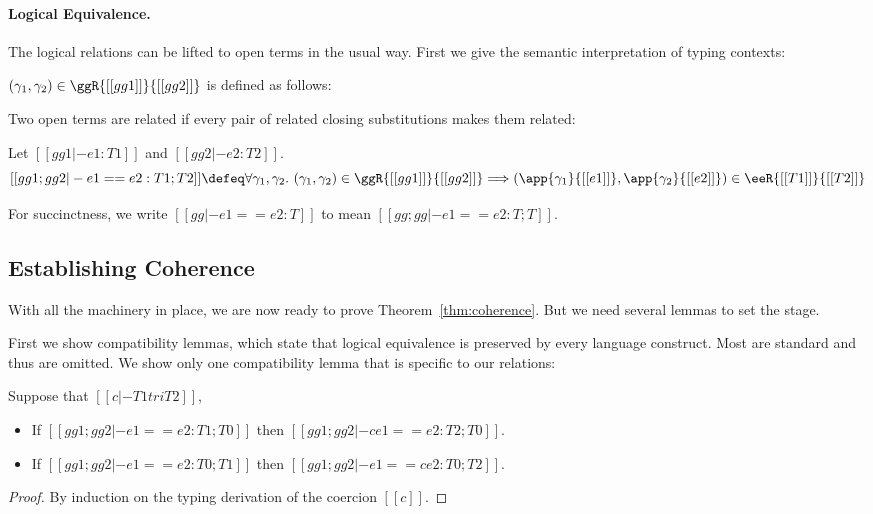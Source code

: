 \paragraph{Logical Equivalence.}
The logical relations can be lifted to open terms in the usual way. First we give the
semantic interpretation of typing contexts:
\begin{definition}
  $(\gamma_1, \gamma_2) \in \ggR{[[gg1]]}{[[gg2]]}$ is defined as follows:
\end{definition}
Two open terms are related if every pair of related closing substitutions
makes them related:
\begin{definition}
  Let $[[gg1 |- e1 : T1]]$ and $[[gg2 |- e2 : T2]]$.
  \[
    [[gg1 ; gg2 |- e1 == e2 : T1 ; T2]] \defeq \forall \gamma_1, \gamma_2 . \  (\gamma_1, \gamma_2) \in \ggR{[[gg1]]}{[[gg2]]} \Longrightarrow (\app{\gamma_1}{[[e1]]}, \app{\gamma_2}{[[e2]]}) \in \eeR{[[T1]]}{[[T2]]}
  \]
\end{definition}
For succinctness, we write $[[gg |- e1 == e2 : T]]$ to mean $[[gg ; gg |- e1 == e2 : T ; T]]$.


\subsection{Establishing Coherence}

With all the machinery in place, we are now ready to prove Theorem~\ref{thm:coherence}. But we need
several lemmas to set the stage.

First we show compatibility lemmas, which state that logical equivalence
is preserved by every language construct. Most are standard and thus are
omitted. We show only one compatibility lemma that is specific to our relations:

\begin{lemma}   \label{lemma:co-compa}
  Suppose that $[[c |- T1 tri T2]]$,
  \begin{itemize}
  \item If $[[gg1 ; gg2 |- e1 == e2 : T1 ; T0]]$ then $[[gg1 ; gg2 |- c e1 == e2 : T2 ; T0]]$.
  \item If $[[gg1 ; gg2 |- e1 == e2 : T0 ; T1]]$ then $[[gg1 ; gg2 |- e1 == c e2 : T0 ; T2]]$.
  \end{itemize}
\end{lemma}
\begin{proof}
  By induction on the typing derivation of the coercion $[[c]]$.
\end{proof}


